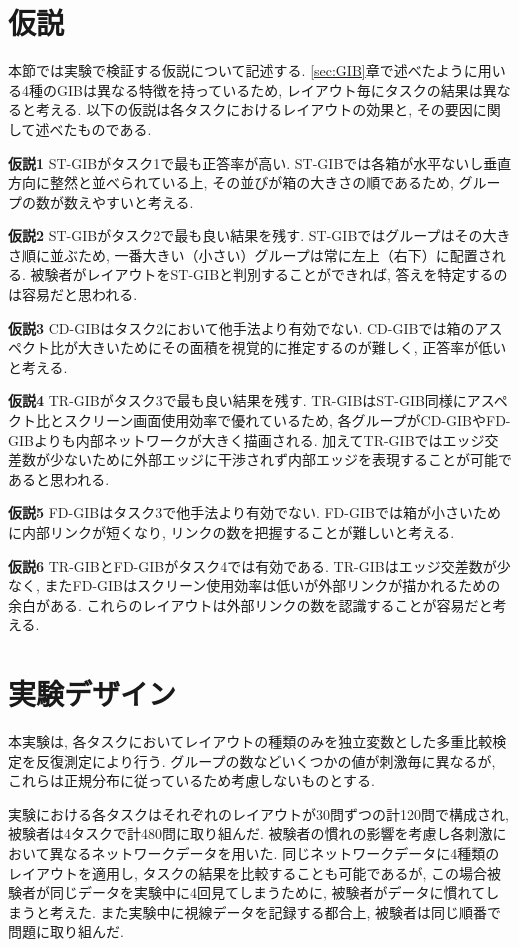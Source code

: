 \documentclass{kuee}
\begin{document}
\section{仮説}
\label{sec:hypothesis}
本節では実験で検証する仮説について記述する.
\ref{sec:GIB}章で述べたように用いる4種のGIBは異なる特徴を持っているため, レイアウト毎にタスクの結果は異なると考える.
以下の仮説は各タスクにおけるレイアウトの効果と, その要因に関して述べたものである.
\begin{description}
  \item{\bf 仮説1} ST-GIBがタスク1で最も正答率が高い.
  ST-GIBでは各箱が水平ないし垂直方向に整然と並べられている上, その並びが箱の大きさの順であるため, グループの数が数えやすいと考える.
  \item{\bf 仮説2} ST-GIBがタスク2で最も良い結果を残す.
  ST-GIBではグループはその大きさ順に並ぶため, 一番大きい（小さい）グループは常に左上（右下）に配置される.
  被験者がレイアウトをST-GIBと判別することができれば, 答えを特定するのは容易だと思われる.
  \item{\bf 仮説3} CD-GIBはタスク2において他手法より有効でない.
  CD-GIBでは箱のアスペクト比が大きいためにその面積を視覚的に推定するのが難しく, 正答率が低いと考える.
  \item{\bf 仮説4} TR-GIBがタスク3で最も良い結果を残す.
  TR-GIBはST-GIB同様にアスペクト比とスクリーン画面使用効率で優れているため, 各グループがCD-GIBやFD-GIBよりも内部ネットワークが大きく描画される.
  加えてTR-GIBではエッジ交差数が少ないために外部エッジに干渉されず内部エッジを表現することが可能であると思われる.
  \item{\bf 仮説5} FD-GIBはタスク3で他手法より有効でない.
  FD-GIBでは箱が小さいために内部リンクが短くなり, リンクの数を把握することが難しいと考える.
  \item{\bf 仮説6} TR-GIBとFD-GIBがタスク4では有効である.
  TR-GIBはエッジ交差数が少なく, またFD-GIBはスクリーン使用効率は低いが外部リンクが描かれるための余白がある.
  これらのレイアウトは外部リンクの数を認識することが容易だと考える.
\end{description}

\section{実験デザイン}
本実験は, 各タスクにおいてレイアウトの種類のみを独立変数とした多重比較検定を反復測定により行う.
グループの数などいくつかの値が刺激毎に異なるが, これらは正規分布に従っているため考慮しないものとする.

実験における各タスクはそれぞれのレイアウトが30問ずつの計120問で構成され, 被験者は4タスクで計480問に取り組んだ.
被験者の慣れの影響を考慮し各刺激において異なるネットワークデータを用いた.
同じネットワークデータに4種類のレイアウトを適用し, タスクの結果を比較することも可能であるが, この場合被験者が同じデータを実験中に4回見てしまうために, 被験者がデータに慣れてしまうと考えた.
また実験中に視線データを記録する都合上, 被験者は同じ順番で問題に取り組んだ.
\end{document}
